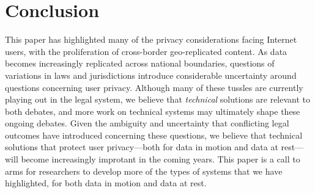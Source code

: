 \section{Conclusion}
\label{sec:conclusion}

This paper has highlighted many of the privacy considerations facing Internet users,
with the proliferation of cross-border geo-replicated content.  As data becomes
increasingly replicated across national boundaries, questions of variations in laws
and jurisdictions introduce considerable uncertainty around questions concerning
user privacy. Although many of these tussles are currently playing out in the legal
system, we believe that {\em technical} solutions are relevant to both debates,
and more work on technical systems may ultimately shape these ongoing debates. Given
the ambiguity and uncertainty that conflicting legal outcomes have introduced concerning
these questions, we believe that technical solutions that protect user privacy---both
for data in motion and data at rest---will become increasingly improtant in the
coming years. This paper is a call to arms for researchers to develop more of the
types of systems that we have highlighted, for both data in motion and data at rest.